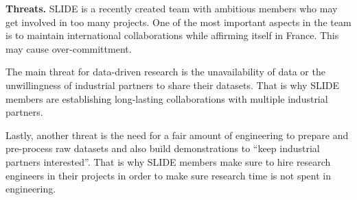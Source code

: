 {\bf  \noindent Threats.}
SLIDE is a recently created team with ambitious members who may get
involved in too many projects. One of the most important aspects in
the team is to maintain international collaborations while affirming
itself in France. This may cause over-committment.  

The main threat for data-driven research is the unavailability of data
or the unwillingness of industrial partners to share their
datasets. That is why SLIDE members are establishing long-lasting
collaborations with multiple industrial partners. 

Lastly, another threat is the need for a fair amount of engineering to
prepare and pre-process raw datasets and also build demonstrations to
``keep industrial partners interested''. That is why SLIDE members
make sure to hire research engineers in their projects in order to
make sure research time is not spent in engineering.






